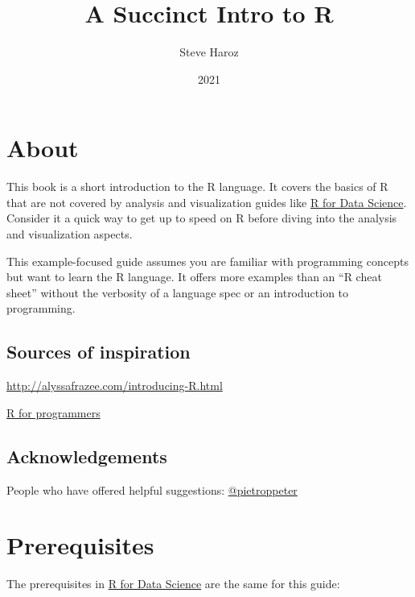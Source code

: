 \documentclass[
]{book}
\title{A Succinct Intro to R}
\author{Steve Haroz}
\date{2021}
\begin{document}
\maketitle

{
\setcounter{tocdepth}{1}
\tableofcontents
}
\hypertarget{about}{%
\chapter*{About}\label{about}}

This book is a short introduction to the R language. It covers the basics of R that are not covered by analysis and visualization guides like \href{https://r4ds.had.co.na}{R for Data Science}. Consider it a quick way to get up to speed on R before diving into the analysis and visualization aspects.

This example-focused guide assumes you are familiar with programming concepts but want to learn the R language. It offers more examples than an ``R cheat sheet'' without the verbosity of a language spec or an introduction to programming.

\hypertarget{sources-of-inspiration}{%
\section*{Sources of inspiration}\label{sources-of-inspiration}}

\url{http://alyssafrazee.com/introducing-R.html}

\href{http://www.johndcook.com/R_language_for_programmers.html}{R for programmers}

\hypertarget{acknowledgements}{%
\section*{Acknowledgements}\label{acknowledgements}}

People who have offered helpful suggestions: \href{https://github.com/pietroppeter}{@pietroppeter}

\hypertarget{prerequisites}{%
\chapter*{Prerequisites}\label{prerequisites}}

The prerequisites in \href{https://r4ds.had.co.nz/introduction.html\#prerequisites}{R for Data Science} are the same for this guide:
\end{document}
